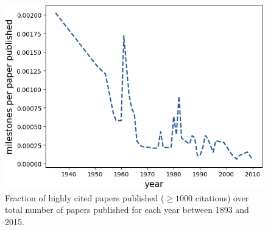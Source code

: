 \documentclass[fleqn,10pt]{wlscirep}
\begin{document}
\begin{figure}[H]
	\centering
	 \includegraphics[width=0.7\columnwidth]{10.png}
	\caption{
	Fraction of highly cited papers published ($\geq 1000$ citations) over total number of papers published for each year between 1893 and 2015.
	}
	\label{fig_SI_ms2}
\end{figure}
\end{document}
